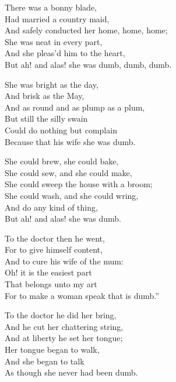 \settowidth{\versewidth}{But ah! and alas! she was dumb, dumb, dumb.}
\begin{dcverse}
\begin{patverse}
\vin There was a bonny blade,\\
Had married a country maid,\\
And safely conducted her home, home, home;\\
She was neat in every part,\\
And she pleas’d him to the heart,\\
But ah! and alas! she was dumb, dumb, dumb.
\end{patverse}

\begin{patverse}
\vin She was bright as the day,\\
And brisk as the May,\\
And as round and as plump as a plum,\\
But still the silly swain\\
Could do nothing but complain\\
Because that his wife she was dumb.
\end{patverse}

\begin{patverse}
\vin She could brew, she could bake,\\
She could sew, and she could make,\\
She could sweep the house with a broom;\\
She could wash, and she could wring,\\
And do any kind of thing,\\
But ah! and alas! she was dumb.
\end{patverse}

\begin{patverse}
\vin To the doctor then he went,\\
For to give himself content,\\
And to cure his wife of the mum:\\
Oh! it is the easiest part\\
That belongs unto my art\\
For to make a woman speak that is dumb.”
\end{patverse}

\begin{patverse}
\vin To the doctor he did her bring,\\
And he cut her chattering string,\\
And at liberty he set her tongue;\\
Her tongue began to walk,\\
And she began to talk\\
As though she never had been dumb.
\end{patverse}


\end{dcverse}

